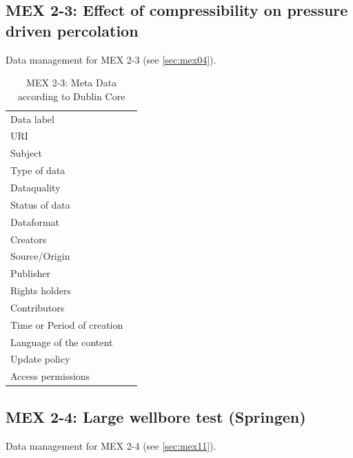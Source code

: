 \subsection{MEX 2-3: Effect of compressibility on pressure driven percolation}

Data management for MEX 2-3 (see \ref{sec:mex04}).

\begin{table}[h!]
\caption{MEX 2-3: Meta Data according to Dublin Core}
\label{tab:}
\small
\begin{tabular}{R{3cm}|L{7cm}}
\hline
%
Data label &  \\
URI &  \\
Subject  &  \\
Type of data  &  \\
Dataquality  &  \\
Status of data  &  \\
Dataformat  & \\
Creators  &  \\
Source/Origin &  \\
Publisher  &  \\
Rights holders &  \\
Contributors &  \\
Time or Period of creation &  \\
Language of the content &  \\
Update policy &  \\
Access permissions &  \\
%
\hline
\end{tabular}
\end{table}

\subsection{MEX 2-4: Large wellbore test (Springen)}

Data management for MEX 2-4 (see \ref{sec:mex11}).

